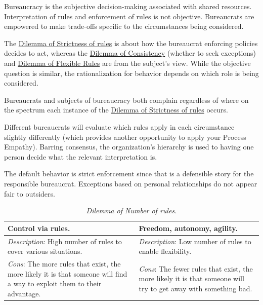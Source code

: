 Bureaucracy is the subjective decision-making associated with shared resources. Interpretation of rules and enforcement of rules is not objective. Bureaucrats are empowered to make trade-offs specific to the circumstances being considered.


The 
\hyperref[table:dilemma-personal-rule-strictness-lax]{Dilemma of Strictness of rules} 
is about how the bureaucrat enforcing policies decides to act, whereas the
\hyperref[table:dilemma-subject-consistency-per-situation]{Dilemma of Consistency} 
(whether to seek exceptions) and
\hyperref[table:dilemma-subject-flexibility]{Dilemma of Flexible Rules}
are from the subject's view. While the objective question is similar, the rationalization for behavior depends on which role is being considered.

Bureaucrats and subjects of bureaucracy both complain regardless of where on the spectrum each instance of the \hyperref[table:dilemma-personal-rule-strictness-lax]{Dilemma of Strictness of rules} occurs. 

Different bureaucrats will evaluate which rules apply in each circumstance slightly differently (which provides another opportunity to apply your Process Empathy). Barring consensus, the organization's hierarchy is used to having one person decide what the relevant interpretation is.

The default behavior is strict enforcement since that is a defensible story for the responsible bureaucrat. Exceptions based on personal relationships do not appear fair to outsiders.


\begin{center}
\begin{table}[H] %
\begin{tabular}{ | m{\dilemmatablewidth}| m{\dilemmatablewidth} | } 
  \hline
  \textbf{Control via rules.} & 
  \textbf{Freedom, autonomy, agility.} \\ 
  \hline
  \textit{Description}: High number of rules to cover various situations. & 
  \textit{Description}: Low number of rules to enable flexibility. \\ 
  \hline
  \textit{Cons}: The more rules that exist, the more likely it is that someone will find a way to exploit them to their advantage. & 
  \textit{Cons}: The fewer rules that exist, the more likely it is that someone will try to get away with something bad. \\  
  \hline
\end{tabular}
\caption{
\textit{Dilemma of Number of rules.}
}
\label{table:dilemma-personal-number-of-rules}
\end{table}
\end{center}



